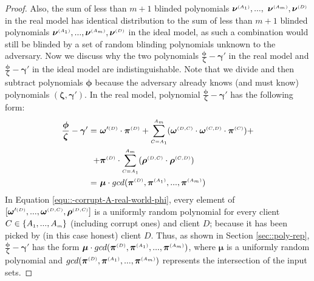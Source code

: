 \begin{proof}
Also, the sum of less than $m+1$ blinded polynomials ${\bm\nu}^{\scriptscriptstyle (A_{\scriptscriptstyle 1})},...,$ ${\bm\nu}^{\scriptscriptstyle (A_{\scriptscriptstyle m})}, \bm\nu^{ \scriptscriptstyle {  {(D)}}}$   in the real model has identical distribution to the sum of less than $m+1$ blinded polynomials $ {\bm\nu}^{\scriptscriptstyle (A_{\scriptscriptstyle 1})},...,  {\bm\nu}^{\scriptscriptstyle (A_{\scriptscriptstyle m})},  {\bm\nu}^{ \scriptscriptstyle {  {(D)}}}$ in the ideal model, as such a combination would still be blinded by a set of random blinding polynomials unknown to the adversary. Now we discuss why the two polynomials $\frac{\bm\phi}{\bm\zeta}- \bm\gamma'$ in the real model and $\frac{ {\bm\phi}} { {\bm\zeta}}-  {\bm\gamma'}$ in the ideal model are indistinguishable. Note that we divide and then subtract  polynomials ${\bm\phi}$ because the adversary already knows (and must know) polynomials $(\bm\zeta, \bm\gamma')$. In the real model, polynomial $\frac{\bm\phi}{\bm\zeta}- \bm\gamma'$ has the following form: 
%
\begin{equation}\label{equ::-corrupt-A-real-world-phi}
%
\begin{split}
 \frac{\bm\phi}{\bm\zeta}- \bm\gamma'=\ &  \bm\omega'^{ \st {  {(D)}}}\cdot \bm\pi^{ \st {  {(D)}} } +\sum\limits^{ \st {   A}_{ \st {   m}}}_{ \st {  {C }= }  \st {   A}_{ \st {  1}}}(\bm\omega^{ \st {  {(D,C)}}} \cdot \bm\omega^{ \st {  {(C,D)}}}\cdot \bm\pi^{ \st {  (C)}})+ \\+ & \bm\pi^{ \st {  {(D)}}}\cdot\sum\limits^{ \st {   A}_{ \st {   m}}}_{ \st {  {C }= }  \st {   A}_{ \st {  1}}}(\bm\rho^{ \st {  {(D,C)}}} \cdot \bm\rho^{ \st {  {(C,D)}}})\\=\ &\bm\mu\cdot gcd( \bm\pi^{ \st {  {(D)}} },\bm\pi^{\st (A_1)}, ..., \bm\pi^{\st (A_m)})
 \end{split}
\end{equation}
In Equation \ref{equ::-corrupt-A-real-world-phi}, every element of   $[\bm\omega'^{ \scriptscriptstyle {  {(D)}}},..., \bm\omega^{ \scriptscriptstyle {  {(D,C)}}}, \bm\rho^{ \scriptscriptstyle {  {(D,C)}}}]$ is a uniformly random polynomial for every  client $C\in \{  {  A}_{ \scriptscriptstyle {   1}}, ...,   {  A}_{ \scriptscriptstyle {   m}}\}$  (including corrupt ones) and client $D$; because it has been picked by (in this case honest) client $D$. Thus,  as shown in Section \ref{sec::poly-rep}, $\frac{\bm\phi}{\bm\zeta}- \bm\gamma'$ has the form $\bm\mu\cdot gcd( \bm\pi^{ \scriptscriptstyle {  {(D)}} },\bm\pi^{\scriptscriptstyle (A_1)}, ..., \bm\pi^{\scriptscriptstyle (A_m)})$, where $\bm\mu$ is a uniformly random polynomial and $gcd( \bm\pi^{ \scriptscriptstyle {  {(D)}} },\bm\pi^{\scriptscriptstyle (A_1)}, ..., \bm\pi^{\scriptscriptstyle (A_m)})$ represents the intersection of the input sets. 


\end{proof}
